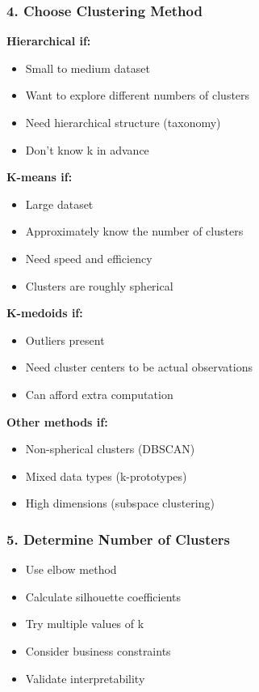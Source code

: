 \documentclass[
]{article}
\begin{document}
\subsubsection{4. Choose Clustering Method}

\textbf{Hierarchical if:}

\begin{itemize}
\item
  Small to medium dataset
\item
  Want to explore different numbers of clusters
\item
  Need hierarchical structure (taxonomy)
\item
  Don't know k in advance
\end{itemize}

\textbf{K-means if:}

\begin{itemize}
\item
  Large dataset
\item
  Approximately know the number of clusters
\item
  Need speed and efficiency
\item
  Clusters are roughly spherical
\end{itemize}

\textbf{K-medoids if:}

\begin{itemize}
\item
  Outliers present
\item
  Need cluster centers to be actual observations
\item
  Can afford extra computation
\end{itemize}

\textbf{Other methods if:}

\begin{itemize}
\item
  Non-spherical clusters (DBSCAN)
\item
  Mixed data types (k-prototypes)
\item
  High dimensions (subspace clustering)
\end{itemize}

\subsubsection{5. Determine Number of Clusters}

\begin{itemize}
\item
  Use elbow method
\item
  Calculate silhouette coefficients
\item
  Try multiple values of k
\item
  Consider business constraints
\item
  Validate interpretability
\end{itemize}
\end{document}
